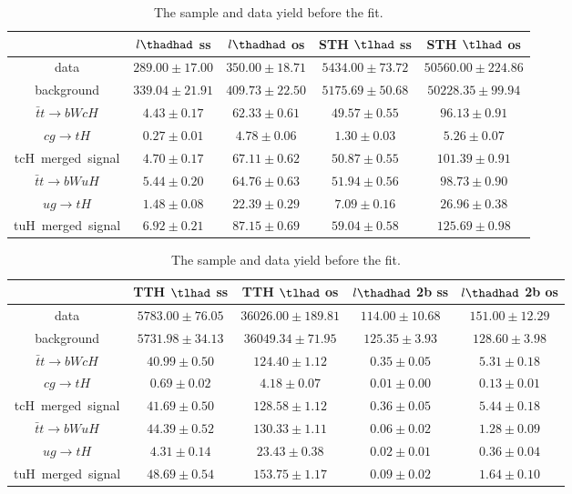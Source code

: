 \begin{table}
\footnotesize
\caption{The sample and data yield before the fit.}
\centering
\begin{tabular}{|c|c|c|c|c|} \hline
 & $l\thadhad$ ss & $l\thadhad$ os & STH $\tlhad$ ss & STH $\tlhad$ os\\\hline
data & $289.00\pm17.00$ & $350.00\pm18.71$ & $5434.00\pm73.72$ & $50560.00\pm224.86$\\\hline
background & $339.04\pm21.91$ & $409.73\pm22.50$ & $5175.69\pm50.68$ & $50228.35\pm99.94$\\\hline
$\bar{t}t\to bWcH$ & $4.43\pm0.17$ & $62.33\pm0.61$ & $49.57\pm0.55$ & $96.13\pm0.91$\\\hline
$cg\to tH$ & $0.27\pm0.01$ & $4.78\pm0.06$ & $1.30\pm0.03$ & $5.26\pm0.07$\\\hline
tcH~merged~signal & $4.70\pm0.17$ & $67.11\pm0.62$ & $50.87\pm0.55$ & $101.39\pm0.91$\\\hline
$\bar{t}t\to bWuH$ & $5.44\pm0.20$ & $64.76\pm0.63$ & $51.94\pm0.56$ & $98.73\pm0.90$\\\hline
$ug\to tH$ & $1.48\pm0.08$ & $22.39\pm0.29$ & $7.09\pm0.16$ & $26.96\pm0.38$\\\hline
tuH~merged~signal & $6.92\pm0.21$ & $87.15\pm0.69$ & $59.04\pm0.58$ & $125.69\pm0.98$\\\hline
\end{tabular}
\begin{tabular}{|c|c|c|c|c|} \hline
 & TTH $\tlhad$ ss & TTH $\tlhad$ os & $l\thadhad$ 2b ss & $l\thadhad$ 2b os\\\hline
data & $5783.00\pm76.05$ & $36026.00\pm189.81$ & $114.00\pm10.68$ & $151.00\pm12.29$\\\hline
background & $5731.98\pm34.13$ & $36049.34\pm71.95$ & $125.35\pm3.93$ & $128.60\pm3.98$\\\hline
$\bar{t}t\to bWcH$ & $40.99\pm0.50$ & $124.40\pm1.12$ & $0.35\pm0.05$ & $5.31\pm0.18$\\\hline
$cg\to tH$ & $0.69\pm0.02$ & $4.18\pm0.07$ & $0.01\pm0.00$ & $0.13\pm0.01$\\\hline
tcH~merged~signal & $41.69\pm0.50$ & $128.58\pm1.12$ & $0.36\pm0.05$ & $5.44\pm0.18$\\\hline
$\bar{t}t\to bWuH$ & $44.39\pm0.52$ & $130.33\pm1.11$ & $0.06\pm0.02$ & $1.28\pm0.09$\\\hline
$ug\to tH$ & $4.31\pm0.14$ & $23.43\pm0.38$ & $0.02\pm0.01$ & $0.36\pm0.04$\\\hline
tuH~merged~signal & $48.69\pm0.54$ & $153.75\pm1.17$ & $0.09\pm0.02$ & $1.64\pm0.10$\\\hline

\end{tabular}
\end{table}
